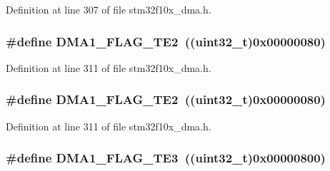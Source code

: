 Definition at line 307 of file stm32f10x\+\_\+dma.\+h.

\subsubsection[{\texorpdfstring{D\+M\+A1\+\_\+\+F\+L\+A\+G\+\_\+\+T\+E2}{DMA1_FLAG_TE2}}]{\setlength{\rightskip}{0pt plus 5cm}\#define D\+M\+A1\+\_\+\+F\+L\+A\+G\+\_\+\+T\+E2~(({\bf uint32\+\_\+t})0x00000080)}\hypertarget{group___d_m_a__flags__definition_ga23bfb917d32a8dd5a96d343ef5f6ea46}{}\label{group___d_m_a__flags__definition_ga23bfb917d32a8dd5a96d343ef5f6ea46}


Definition at line 311 of file stm32f10x\+\_\+dma.\+h.

\subsubsection[{\texorpdfstring{D\+M\+A1\+\_\+\+F\+L\+A\+G\+\_\+\+T\+E2}{DMA1_FLAG_TE2}}]{\setlength{\rightskip}{0pt plus 5cm}\#define D\+M\+A1\+\_\+\+F\+L\+A\+G\+\_\+\+T\+E2~(({\bf uint32\+\_\+t})0x00000080)}\hypertarget{group___d_m_a__flags__definition_ga23bfb917d32a8dd5a96d343ef5f6ea46}{}\label{group___d_m_a__flags__definition_ga23bfb917d32a8dd5a96d343ef5f6ea46}


Definition at line 311 of file stm32f10x\+\_\+dma.\+h.

\subsubsection[{\texorpdfstring{D\+M\+A1\+\_\+\+F\+L\+A\+G\+\_\+\+T\+E3}{DMA1_FLAG_TE3}}]{\setlength{\rightskip}{0pt plus 5cm}\#define D\+M\+A1\+\_\+\+F\+L\+A\+G\+\_\+\+T\+E3~(({\bf uint32\+\_\+t})0x00000800)}\hypertarget{group___d_m_a__flags__definition_gaa0b3d86f09829d0388273f0cd51698cc}{}\label{group___d_m_a__flags__definition_gaa0b3d86f09829d0388273f0cd51698cc}


